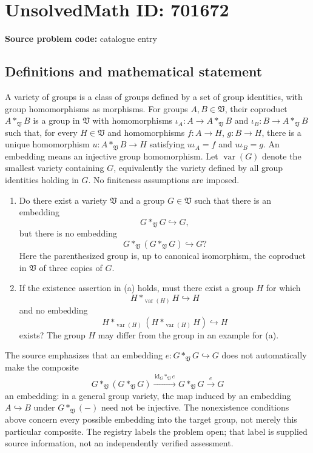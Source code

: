 \documentclass[11pt]{article}
\begin{document}
\section*{UnsolvedMath ID: 701672}
\textbf{Source problem code:} catalogue entry
\subsection{Definitions and mathematical statement}
A variety of groups is a class of groups defined by a set of group identities, with group homomorphisms as morphisms. For groups \(A,B\in\mathfrak V\), their coproduct \(A*_{\mathfrak V}B\) is a group in \(\mathfrak V\) with homomorphisms \(\iota_A:A\to A*_{\mathfrak V}B\) and \(\iota_B:B\to A*_{\mathfrak V}B\) such that, for every \(H\in\mathfrak V\) and homomorphisms \(f:A\to H\), \(g:B\to H\), there is a unique homomorphism \(u:A*_{\mathfrak V}B\to H\) satisfying \(u\iota_A=f\) and \(u\iota_B=g\). An embedding means an injective group homomorphism. Let \(\operatorname{var}(G)\) denote the smallest variety containing \(G\), equivalently the variety defined by all group identities holding in \(G\). No finiteness assumptions are imposed.

\begin{enumerate}
\item[(a)] Do there exist a variety \(\mathfrak V\) and a group \(G\in\mathfrak V\) such that there is an embedding
\[
G*_{\mathfrak V}G\hookrightarrow G,
\]
but there is no embedding
\[
G*_{\mathfrak V}(G*_{\mathfrak V}G)\hookrightarrow G?
\]
Here the parenthesized group is, up to canonical isomorphism, the coproduct in \(\mathfrak V\) of three copies of \(G\).
\item[(b)] If the existence assertion in (a) holds, must there exist a group \(H\) for which
\[
H*_{\operatorname{var}(H)}H\hookrightarrow H
\]
and no embedding
\[
H*_{\operatorname{var}(H)}
  (H*_{\operatorname{var}(H)}H)\hookrightarrow H
\]
exists? The group \(H\) may differ from the group in an example for (a).
\end{enumerate}

The source emphasizes that an embedding \(e:G*_{\mathfrak V}G\hookrightarrow G\) does not automatically make the composite
\[
G*_{\mathfrak V}(G*_{\mathfrak V}G)
\xrightarrow{\,\mathrm{id}_G*_{\mathfrak V}e\,}
G*_{\mathfrak V}G
\xrightarrow{\,e\,}G
\]
an embedding: in a general group variety, the map induced by an embedding \(A\hookrightarrow B\) under \(G*_{\mathfrak V}(-)\) need not be injective. The nonexistence conditions above concern every possible embedding into the target group, not merely this particular composite. The registry labels the problem open; that label is supplied source information, not an independently verified assessment.
\end{document}
